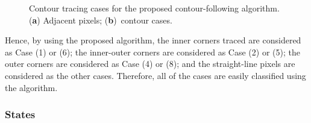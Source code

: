 \documentclass[sensors,article,accept,moreauthors,pdftex,10pt,a4paper]{mdpi}
\begin{document}
\begin{figure}[H]
	\centering

	\caption{Contour tracing cases for the proposed contour-following algorithm. (\textbf{a}) Adjacent pixels; (\textbf{b})~contour cases.}
	\label{fig:image9}
\end{figure}


Hence, by using the proposed algorithm, the inner corners traced are considered as Case (1) or (6); the inner-outer corners are considered as Case (2) or (5); the outer corners are considered as Case (4) or (8); and the straight-line pixels are considered as the other cases. Therefore, all of the cases are easily classified using the algorithm. 




\subsubsection{States}



\end{document}

